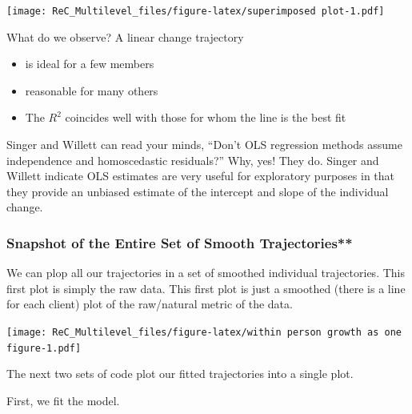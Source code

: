 \documentclass[
  english,
]{book}
\newenvironment{Shaded}{\begin{snugshade}}{\end{snugshade}}
\newcommand{\CommentTok}[1]{\textcolor[rgb]{0.56,0.35,0.01}{\textit{#1}}}
\newcommand{\FunctionTok}[1]{\textcolor[rgb]{0.00,0.00,0.00}{#1}}
\newcommand{\NormalTok}[1]{#1}
\newcommand{\SpecialCharTok}[1]{\textcolor[rgb]{0.00,0.00,0.00}{#1}}
\providecommand{\tightlist}{%
  \setlength{\itemsep}{0pt}\setlength{\parskip}{0pt}}
\begin{document}
\texttt{[image: ReC\_Multilevel\_files/figure-latex/superimposed plot-1.pdf]}

What do we observe? A linear change trajectory

\begin{itemize}
\tightlist
\item
  is ideal for a few members
\item
  reasonable for many others
\item
  The \(R^2\) coincides well with those for whom the line is the best fit
\end{itemize}

Singer and Willett \citeyearpar{singer_applied_2003} can read your minds, ``Don't OLS regression methods assume independence and homoscedastic residuals?'' Why, yes! They do. Singer and Willett indicate OLS estimates are very useful for exploratory purposes in that they provide an unbiased estimate of the intercept and slope of the individual change.

\hypertarget{snapshot-of-the-entire-set-of-smooth-trajectories}{%
\subsubsection{Snapshot of the Entire Set of Smooth Trajectories**}\label{snapshot-of-the-entire-set-of-smooth-trajectories}}

We can plop all our trajectories in a set of smoothed individual trajectories. This first plot is simply the raw data. This first plot is just a smoothed (there is a line for each client) plot of the raw/natural metric of the data.

\begin{Shaded}
\end{Shaded}

\texttt{[image: ReC\_Multilevel\_files/figure-latex/within person growth as one figure-1.pdf]}

The next two sets of code plot our fitted trajectories into a single plot.

First, we fit the model.
\end{document}
